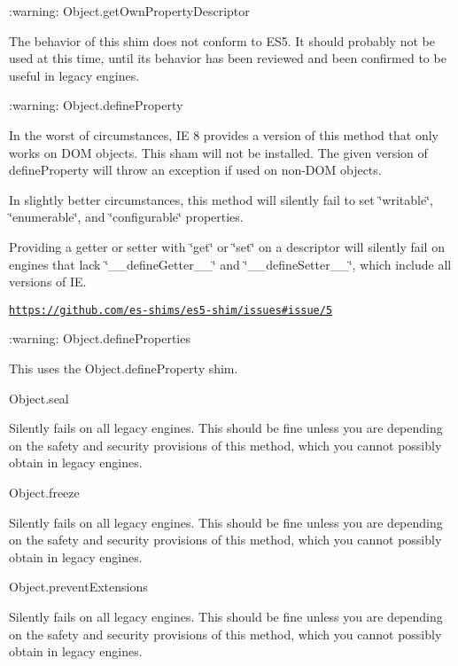 \begin{DoxyItemize}
\item \+:warning\+: Object.\+get\+Own\+Property\+Descriptor

The behavior of this shim does not conform to E\+S5. It should probably not be used at this time, until its behavior has been reviewed and been confirmed to be useful in legacy engines.
\item \+:warning\+: Object.\+define\+Property

In the worst of circumstances, I\+E 8 provides a version of this method that only works on D\+O\+M objects. This sham will not be installed. The given version of {\ttfamily define\+Property} will throw an exception if used on non-\/\+D\+O\+M objects.

In slightly better circumstances, this method will silently fail to set \char`\"{}writable\char`\"{}, \char`\"{}enumerable\char`\"{}, and \char`\"{}configurable\char`\"{} properties.

Providing a getter or setter with \char`\"{}get\char`\"{} or \char`\"{}set\char`\"{} on a descriptor will silently fail on engines that lack \char`\"{}\+\_\+\+\_\+define\+Getter\+\_\+\+\_\+\char`\"{} and \char`\"{}\+\_\+\+\_\+define\+Setter\+\_\+\+\_\+\char`\"{}, which include all versions of I\+E.

\href{https://github.com/es-shims/es5-shim/issues#issue/5}{\tt https\+://github.\+com/es-\/shims/es5-\/shim/issues\#issue/5}
\item \+:warning\+: Object.\+define\+Properties

This uses the Object.\+define\+Property shim.
\item Object.\+seal

Silently fails on all legacy engines. This should be fine unless you are depending on the safety and security provisions of this method, which you cannot possibly obtain in legacy engines.
\item Object.\+freeze

Silently fails on all legacy engines. This should be fine unless you are depending on the safety and security provisions of this method, which you cannot possibly obtain in legacy engines.
\item Object.\+prevent\+Extensions

Silently fails on all legacy engines. This should be fine unless you are depending on the safety and security provisions of this method, which you cannot possibly obtain in legacy engines. 
\end{DoxyItemize}